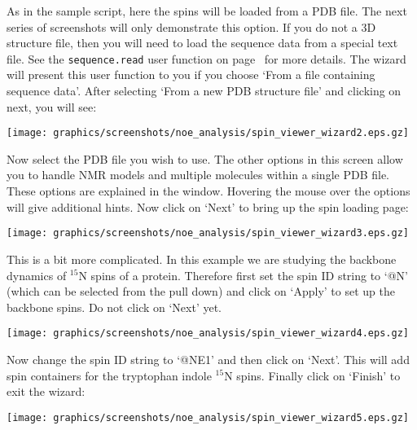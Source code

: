 As in the sample script, here the spins will be loaded from a PDB file.  The next series of screenshots will only demonstrate this option.  If you do not a 3D structure file, then you will need to load the sequence data from a special text file.  See the \texttt{sequence.read} user function on page~\pageref{uf: sequence.read} for more details.  The wizard will present this user function to you if you choose `From a file containing sequence data'.  After selecting `From a new PDB structure file' and clicking on next, you will see:

\begin{minipage}[h]{\linewidth}
\centerline{\texttt{[image: graphics/screenshots/noe\_analysis/spin\_viewer\_wizard2.eps.gz]}}
\end{minipage}

Now select the PDB file you wish to use.  The other options in this screen allow you to handle NMR models and multiple molecules within a single PDB file.  These options are explained in the window.  Hovering the mouse over the options will give additional hints.  Now click on `Next' to bring up the spin loading page:

\begin{minipage}[h]{\linewidth}
\centerline{\texttt{[image: graphics/screenshots/noe\_analysis/spin\_viewer\_wizard3.eps.gz]}}
\end{minipage}

This is a bit more complicated.  In this example we are studying the backbone dynamics of $^{15}$N spins of a protein.  Therefore first set the spin ID string to `@N' (which can be selected from the pull down) and click on `Apply' to set up the backbone spins.  Do not click on `Next' yet.


\begin{minipage}[h]{\linewidth}
\centerline{\texttt{[image: graphics/screenshots/noe\_analysis/spin\_viewer\_wizard4.eps.gz]}}
\end{minipage}

Now change the spin ID string to `@NE1' and then click on `Next'.  This will add spin containers for the tryptophan indole $^{15}$N spins.  Finally click on `Finish' to exit the wizard:

\begin{minipage}[h]{\linewidth}
\centerline{\texttt{[image: graphics/screenshots/noe\_analysis/spin\_viewer\_wizard5.eps.gz]}}
\end{minipage}

